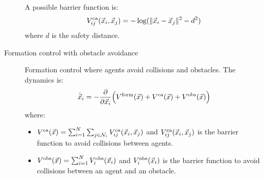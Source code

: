 \begin{description}
        \begin{remark}
            A possible barrier function is:
            \[
                V_{ij}^\text{ca}({\vec{x}}_i, {\vec{x}}_j) = - \log( \Vert {\vec{x}}_i - {\vec{x}}_j \Vert^2 - d^2 )
            \]
            where $d$ is the safety distance.
        \end{remark}

    \item[Formation control with obstacle avoidance] 
        Formation control where agents avoid collisions and obstacles. The dynamics is:
        \[
            \dot{{\vec{x}}}_i = - \frac{\partial}{\partial {\vec{x}}_i} \Big( V^\text{form}({\vec{x}}) + V^\text{ca}({\vec{x}}) + V^\text{obs}({\vec{x}}) \Big)
        \]
        where:
        \begin{itemize}
            \item $V^\text{ca}({\vec{x}}) = \sum_{i=1}^N \sum_{j \in \mathcal{N}_i} V_{ij}^\text{ca}({\vec{x}}_i, {\vec{x}}_j)$ and $V_{ij}^\text{ca}({\vec{x}}_i, {\vec{x}}_j)$ is the barrier function to avoid collisions between agents.
            \item $V^\text{obs}({\vec{x}}) = \sum_{i=1}^N V_{i}^\text{obs}({\vec{x}}_i)$ and $V_{i}^\text{obs}({\vec{x}}_i)$ is the barrier function to avoid collisions between an agent and an obstacle.
        \end{itemize}
\end{description}


